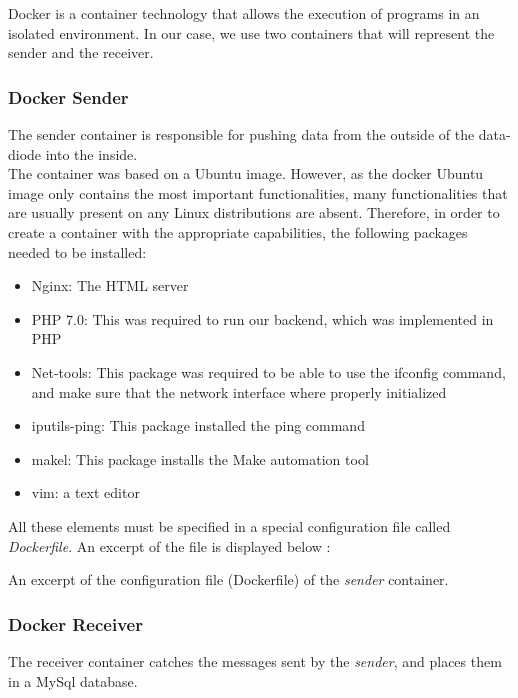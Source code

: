 \documentclass[a4paper,11pt]{article}
\begin{document}
Docker is a container technology that allows the execution of programs in an isolated environment. In our case, we use two containers that will represent the sender and the receiver.

\subsubsection{Docker Sender}
The sender container is responsible for pushing data from the outside of the data-diode into the inside.\\

The container was based on a Ubuntu image. However, as the docker Ubuntu image only contains the most important functionalities, many functionalities that are usually present on any Linux distributions are absent. Therefore, in order to create a container with the appropriate capabilities, the following packages needed to be installed:

\begin{itemize}
	\item{Nginx: The HTML server}
	\item{PHP 7.0: This was required to run our backend, which was implemented in PHP}
	\item{Net-tools: This package was required to be able to use the ifconfig command, and make sure that the network interface where properly initialized}
	\item{iputils-ping: This package installed the ping command}
	\item{makel: This package installs the Make automation tool}
	\item{vim: a text editor}
\end{itemize}

All these elements must be specified in a special configuration file called \textit{Dockerfile}. An excerpt of the file is displayed below :\\

\begin{table}

\caption{An excerpt of the configuration file (Dockerfile) of the \textit{sender} container.}
\end{table}

\subsubsection{Docker Receiver}
The receiver container catches the messages sent by the \textit{sender}, and places them in a MySql database.\\
\end{document}
